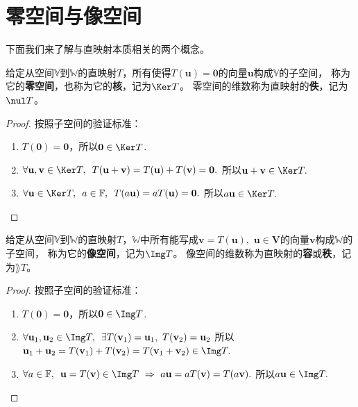 \documentclass[12pt,UTF8]{ctexbook}
\begin{document}
\section{零空间与像空间}
下面我们来了解与直映射本质相关的两个概念。
\begin{pp}\label{pp:3_2}
    给定从空间$\mathbb{V}$到$\mathbb{W}$的直映射$T$，所有使得$T(\mathbf{u}) = \mathbf{0}$的向量$\mathbf{u}$构成$\mathbb{V}$的子空间，
    称为它的\textbf{零空间}，也称为它的\textbf{核}，记为$\Ker T$。
    零空间的维数称为直映射的\textbf{佚}，记为$\nul T$。
\end{pp}
\begin{proof} %
    按照子空间的验证标准：
    \begin{enumerate}
        \item $T(\mathbf{0}) = \mathbf{0}$，所以$\mathbf{0} \in \Ker T$.
        \item $\forall \mathbf{u}, \mathbf{v} \in \Ker T, \,\,\, T(\mathbf{u} + \mathbf{v}) = T(\mathbf{u}) + T(\mathbf{v}) = \mathbf{0}.$ 所以$\mathbf{u} + \mathbf{v} \in \Ker T.$
        \item $\forall \mathbf{u} \in \Ker T,\,\,\, a\in\mathbb{F},\,\,\, T(a\mathbf{u}) = aT(\mathbf{u}) = \mathbf{0}.$ 所以$a\mathbf{u} \in \Ker T.$
    \end{enumerate}
\end{proof}


\begin{pp}\label{pp:3_3}
    给定从空间$\mathbb{V}$到$\mathbb{W}$的直映射$T$，$\mathbb{W}$中所有能写成$\mathbf{v} = T(\mathbf{u}),\,\,\mathbf{u}\in\mathbf{V}$的向量$\mathbf{v}$构成$\mathbb{W}$的子空间，
    称为它的\textbf{像空间}，记为$\Img T$。
    像空间的维数称为直映射的\textbf{容}或\textbf{秩}，记为$\rang T$。
\end{pp}
\begin{proof} %
    按照子空间的验证标准：
    \begin{enumerate}
        \item $T(\mathbf{0}) = \mathbf{0}$，所以$\mathbf{0} \in \Img T$.
        \item $\forall \mathbf{u}_1, \mathbf{u}_2 \in \Img T, \,\,\, \exists T(\mathbf{v}_1) = \mathbf{u}_1,\,\,T(\mathbf{v}_2) = \mathbf{u}_2$ 所以$\mathbf{u}_1 + \mathbf{u}_2 = T(\mathbf{v}_1) + T(\mathbf{v}_2) = T(\mathbf{v}_1 + \mathbf{v}_2) \in \Img T.$
        \item $\forall  a\in\mathbb{F},\,\,\,\mathbf{u} = T(\mathbf{v}) \in \Img T\,\, \Rightarrow \,\, a\mathbf{u} = aT(\mathbf{v}) = T(a\mathbf{v}).$ 所以$a\mathbf{u} \in \Img T.$
    \end{enumerate}
\end{proof}
\end{document}
